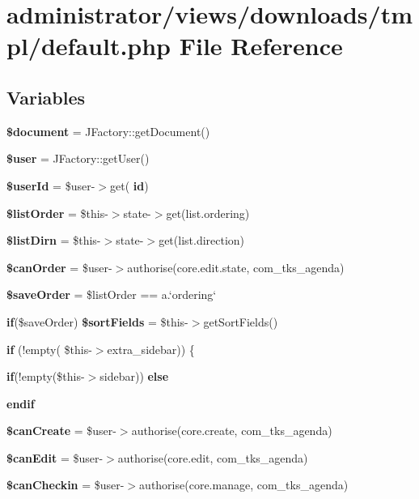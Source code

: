 \section{administrator/views/downloads/tmpl/default.php File Reference}
\label{administrator_2views_2downloads_2tmpl_2default_8php}
\subsection*{Variables}
\begin{DoxyCompactItemize}
\item 
\textbf{ \$document} = J\+Factory\+::get\+Document()
\item 
\textbf{ \$user} = J\+Factory\+::get\+User()
\item 
\textbf{ \$user\+Id} = \$user-\/$>$get(\textquotesingle{}\textbf{ id}\textquotesingle{})
\item 
\textbf{ \$list\+Order} = \$this-\/$>$state-\/$>$get(\textquotesingle{}list.\+ordering\textquotesingle{})
\item 
\textbf{ \$list\+Dirn} = \$this-\/$>$state-\/$>$get(\textquotesingle{}list.\+direction\textquotesingle{})
\item 
\textbf{ \$can\+Order} = \$user-\/$>$authorise(\textquotesingle{}core.\+edit.\+state\textquotesingle{}, \textquotesingle{}com\+\_\+tks\+\_\+agenda\textquotesingle{})
\item 
\textbf{ \$save\+Order} = \$list\+Order == \textquotesingle{}a.`ordering`\textquotesingle{}
\item 
\textbf{ if}(\$save\+Order) \textbf{ \$sort\+Fields} = \$this-\/$>$get\+Sort\+Fields()
\item 
\textbf{ if} (!empty( \$this-\/$>$extra\+\_\+sidebar)) \{
\item 
\textbf{ if}(!empty(\$this-\/$>$sidebar)) \textbf{ else}
\item 
\textbf{ endif}
\item 
\textbf{ \$can\+Create} = \$user-\/$>$authorise(\textquotesingle{}core.\+create\textquotesingle{}, \textquotesingle{}com\+\_\+tks\+\_\+agenda\textquotesingle{})
\item 
\textbf{ \$can\+Edit} = \$user-\/$>$authorise(\textquotesingle{}core.\+edit\textquotesingle{}, \textquotesingle{}com\+\_\+tks\+\_\+agenda\textquotesingle{})
\item 
\textbf{ \$can\+Checkin} = \$user-\/$>$authorise(\textquotesingle{}core.\+manage\textquotesingle{}, \textquotesingle{}com\+\_\+tks\+\_\+agenda\textquotesingle{})

\end{DoxyCompactItemize}
